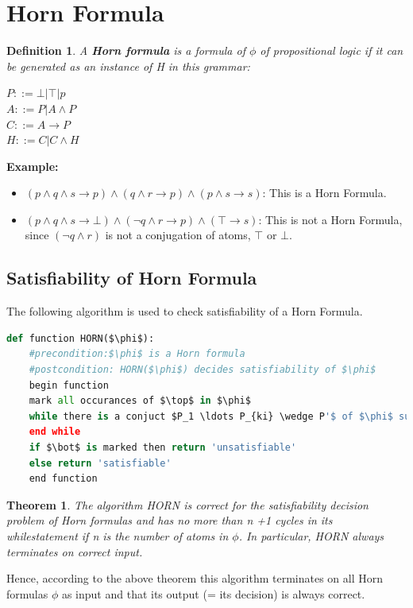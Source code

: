 \documentclass{report}
\newtheorem{theorem}{Theorem}
\newtheorem{definition}{Definition}[chapter]
\begin{document}
\section{Horn Formula}
\begin{definition}
    A \textbf{Horn formula} is a formula of $\phi$ of propositional logic if it can be generated as an instance of H in this grammar:
    \begin{center}
        $P::= \bot |  \top  | p$\\
        $A::= P| A \wedge P$\\
        $C::= A \to P$\\
        $H::= C| C \wedge H$
    \end{center}
\end{definition}
\textbf{Example:}\par
\begin{itemize}
    \item $(p \wedge q \wedge s \to p) \wedge (q \wedge r \to p) \wedge (p \wedge s \to s)$: This is a Horn Formula.
    \item $(p \wedge q \wedge s \to \bot) \wedge (\neg q \wedge r \to p) \wedge (\top \to s)$: This is not a Horn Formula, since $(\neg q \wedge r)$ is not a conjugation of atoms, $\top$ or $\bot$. 
\end{itemize}
\subsection{Satisfiability of Horn Formula}
The following algorithm is used to check satisfiability of a Horn Formula. 

\begin{lstlisting}[language=Python]
def function HORN($\phi$):
    #precondition:$\phi$ is a Horn formula
    #postcondition: HORN($\phi$) decides satisfiability of $\phi$
    begin function
    mark all occurances of $\top$ in $\phi$
    while there is a conjuct $P_1 \ldots P_{ki} \wedge P'$ of $\phi$ such that all $P_j$            are marked but $P'$ is not if mark $P'$
    end while
    if $\bot$ is marked then return 'unsatisfiable'
    else return 'satisfiable'
    end function
\end{lstlisting}

\begin{theorem}
The algorithm HORN is correct for the satisﬁability decision problem of Horn formulas and has no more than n +1 cycles in its whilestatement if n is the number of atoms in $\phi$. In particular, HORN always terminates on correct input.
\end{theorem}
Hence, according to the above theorem this algorithm terminates on all Horn formulas $\phi$ as input and that its output (= its decision) is always correct. 
\end{document}
